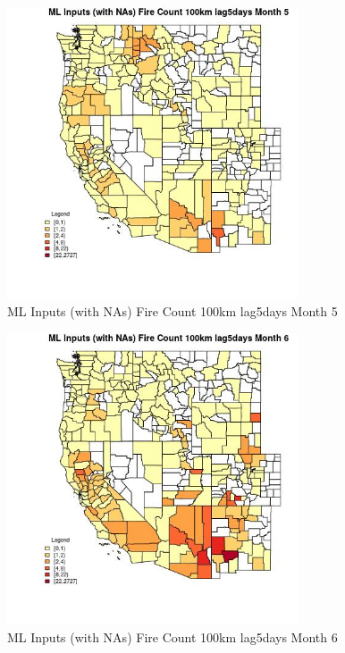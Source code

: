 \begin{figure} 
\centering  
\includegraphics[width=0.77\textwidth]{Code_Outputs/Report_ML_input_PM25_Step4_part_f_de_duplicated_aveswNAs_CountyFire_Count_100km_lag5daysmedianMonth5.jpg} 
\caption{\label{fig:Report_ML_input_PM25_Step4_part_f_de_duplicated_aveswNAsCountyFire_Count_100km_lag5daysmedianMonth5}ML Inputs (with NAs) Fire Count 100km lag5days Month 5} 
\end{figure} 
 

\begin{figure} 
\centering  
\includegraphics[width=0.77\textwidth]{Code_Outputs/Report_ML_input_PM25_Step4_part_f_de_duplicated_aveswNAs_CountyFire_Count_100km_lag5daysmedianMonth6.jpg} 
\caption{\label{fig:Report_ML_input_PM25_Step4_part_f_de_duplicated_aveswNAsCountyFire_Count_100km_lag5daysmedianMonth6}ML Inputs (with NAs) Fire Count 100km lag5days Month 6} 
\end{figure} 
 

